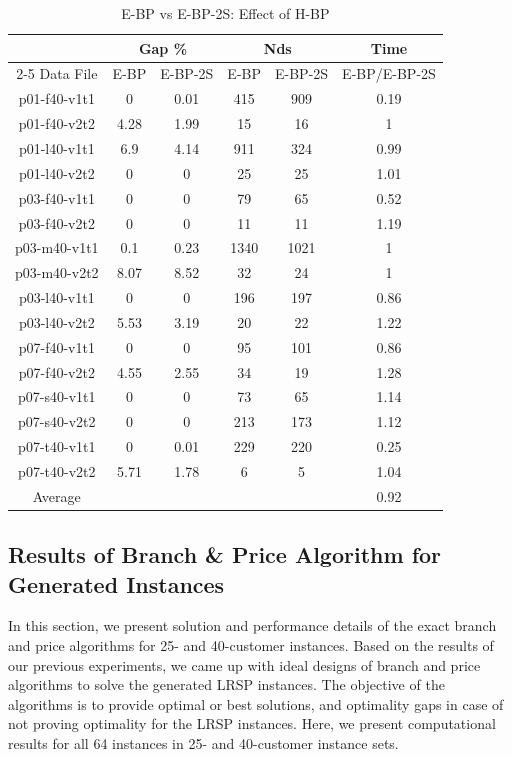 \begin{table}[!h]
\centering
\caption{E-BP vs E-BP-2S: Effect of H-BP}\label{hbp-table40}
\begin {tabular}[!h]{|c|c|c|c|c|c|}
\hline
\mbox{}   & \multicolumn{2}{|c|}{Gap \%} & \multicolumn{2}{|c|}{Nds} & Time  \\\cline{2-5}
Data File & E-BP  & E-BP-2S & E-BP  & E-BP-2S &  E-BP/E-BP-2S \\\hline
p01-f40-v1t1 &  0    &  0.01    & 415   & 909   & 0.19  \\
p01-f40-v2t2 &  4.28 &  1.99    & 15    & 16    & 1 \\
p01-l40-v1t1 &  6.9  &  4.14    & 911   & 324   & 0.99  \\
p01-l40-v2t2 &  0    &  0   & 25    & 25    & 1.01  \\
p03-f40-v1t1 &  0    &  0   & 79    & 65    & 0.52  \\
p03-f40-v2t2 &  0    &  0   & 11    & 11    & 1.19  \\
p03-m40-v1t1 &  0.1  &  0.23    & 1340  & 1021  & 1 \\
p03-m40-v2t2 &  8.07 &  8.52    & 32    & 24    & 1 \\
p03-l40-v1t1 &  0    &  0   & 196   & 197   & 0.86  \\
p03-l40-v2t2 &  5.53 &  3.19    & 20    & 22    & 1.22  \\
p07-f40-v1t1 &  0    &  0   & 95    & 101   & 0.86  \\
p07-f40-v2t2 &  4.55 &  2.55    & 34    & 19    & 1.28  \\
p07-s40-v1t1 &  0    &  0   & 73    & 65    & 1.14  \\
p07-s40-v2t2 &  0    &  0   & 213   & 173   & 1.12  \\
p07-t40-v1t1 &  0    &  0.01    & 229   & 220   & 0.25  \\
p07-t40-v2t2 &  5.71 &  1.78    & 6 & 5 & 1.04  \\\hline
Average & \mbox{}    &  \mbox{} & \mbox{}& \mbox{}& 0.92 \\\hline
\end{tabular}
\end{table}


\subsection{Results of Branch \& Price Algorithm for Generated Instances}

In this section, we present solution and performance details of the exact branch
and price algorithms for 25- and 40-customer instances. Based on the results of our
previous experiments, we came up with ideal designs of branch and price
algorithms to solve the generated LRSP instances. The objective of the algorithms
is to provide optimal or best solutions, and optimality gaps in case of
not proving optimality for the LRSP instances. Here, we present computational results
for all 64 instances in 25- and 40-customer instance sets.

